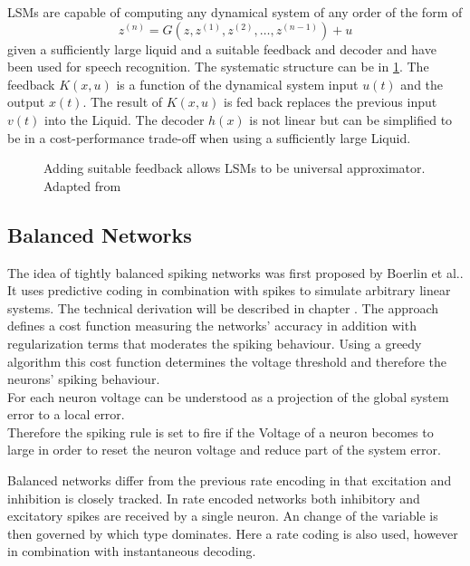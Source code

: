 \acp{LSM} are capable of computing any dynamical system of any order of the form of
\begin{equation}
	z^{(n)} = G(z,z^{(1)},z^{(2)},\dots,z^{(n-1)}) + u
\end{equation}
given a sufficiently large liquid and a suitable feedback and decoder\cite{maass_computational_2004} and have been used for speech recognition\cite{jin_performance_2017}\cite{zhang_digital_2015}. The systematic structure can be in \cref{fig:LSM_feedback}. The feedback $K(x,u)$ is a function of the dynamical system input $u(t)$ and the output $x(t)$. The result of $K(x,u)$ is fed back replaces the previous input $v(t)$ into the Liquid. The decoder $h(x)$ is not linear but can be simplified to be in a cost-performance trade-off when using a sufficiently large Liquid.\\
\begin{figure}[htbp]
	\centering
	
	\caption{Adding suitable feedback allows \acp{LSM} to be universal approximator. Adapted from \cite{maass_computational_2007}}
	\label{fig:LSM_feedback}
\end{figure}


\subsection{Balanced Networks}
The idea of tightly balanced spiking networks was first proposed by Boerlin et al.\cite{boerlin_predictive_2013}. It uses predictive coding in combination with spikes to simulate arbitrary linear systems.
The technical derivation will be described in chapter . The approach defines a cost function measuring the networks' accuracy in addition with regularization terms that moderates the spiking behaviour. Using a greedy algorithm this cost function determines the voltage threshold and therefore the neurons' spiking behaviour.\\
For each neuron voltage can be understood as a projection of the global system error to a local error.\\
Therefore the spiking rule is set to fire if the Voltage of a neuron becomes to large in order to reset the neuron voltage and reduce part of the system error.


Balanced networks differ from the previous rate encoding in that excitation and inhibition is closely tracked. In rate encoded networks both inhibitory and excitatory spikes are received by a single neuron. An change of the variable is then governed by which type dominates. Here a rate coding is also used, however in combination with instantaneous decoding\cite{johnson_minimum-error_2016}.


